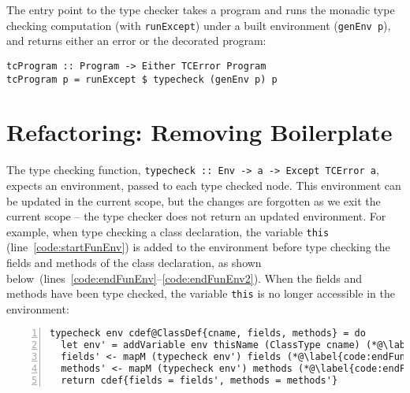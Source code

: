\documentclass[sigplan,screen]{acmart}
\makeatletter
\newcommand{\ec}[1]{\lstinline[style=encore,breaklines=true,basicstyle=\fontsize{9}{9}\tt]@#1@}
\makeatother
\begin{document}
The entry point to the type checker takes a program
and runs the monadic type checking computation (with \ec{runExcept}) under a built
environment (\ec{genEnv p}), and returns either an error or the decorated program:

\begin{minipage}[t]{\linewidth}
\begin{lstlisting}[style=encore]
tcProgram :: Program -> Either TCError Program
tcProgram p = runExcept $ typecheck (genEnv p) p
\end{lstlisting}
\end{minipage}



\section{Refactoring: Removing Boilerplate}
\label{sec:reader}

\begin{sloppypar}
The type checking function, \ec{typecheck :: Env -> a -> Except TCError a},
expects an environment, passed to each type checked node. This
environment can be updated in the current scope, but the changes are forgotten as
we exit the current scope -- the type checker does not return an updated environment.
%
For example, when type checking a class declaration, the
variable \ec{this} (line~\ref{code:startFunEnv}) is added to the environment before
type checking the fields and methods of the class declaration, as shown
below~(lines~\ref{code:endFunEnv}--\ref{code:endFunEnv2}). When
the fields and methods have been type checked, the variable \ec{this} is no longer
accessible in the environment:
\end{sloppypar}
%
\begin{minipage}[t]{\linewidth}
\begin{lstlisting}[style=encore,numbers=left,xleftmargin=8ex]
typecheck env cdef@ClassDef{cname, fields, methods} = do
  let env' = addVariable env thisName (ClassType cname) (*@\label{code:startFunEnv}@*)
  fields' <- mapM (typecheck env') fields (*@\label{code:endFunEnv}@*)
  methods' <- mapM (typecheck env') methods (*@\label{code:endFunEnv2}@*)
  return cdef{fields = fields', methods = methods'}
\end{lstlisting}
\end{minipage}
\end{document}
